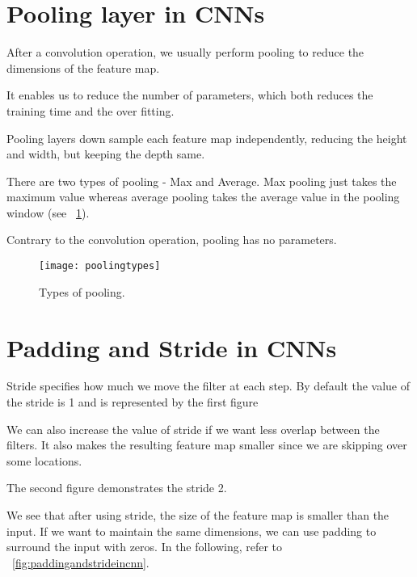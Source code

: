 	\section{Pooling layer in CNNs}

	\begin{bulletedlist}
		\item After a convolution operation, we usually perform pooling to reduce the dimensions of the feature map.
		\item It enables us to reduce the number of parameters, which both reduces the training time and the over fitting.
		\item Pooling layers down sample each feature map independently, reducing the height and width, but keeping the depth same.
		\item There are two types of pooling - Max and Average.  Max pooling just takes the maximum value whereas average pooling takes the average value in the pooling window (see \figurename~\ref{fig:poolingtypes}).
		\item Contrary to the convolution operation, pooling has no parameters.
	\end{bulletedlist}

	\begin{figure}[h]
		\centering
		\texttt{[image: poolingtypes]}
		\caption[Types of pooling]{Types of pooling.}
		\label{fig:poolingtypes}
	\end{figure}

	\section{Padding and Stride in CNNs}
	\begin{bulletedlist}
		\item Stride specifies how much we move the filter at each step. By default the value of the stride is 1 and is represented by the first figure
		\item We can also increase the value of stride if we want less overlap between the filters. It also makes the resulting feature map smaller since we are skipping over some locations.
		\item The second figure demonstrates the stride 2.
	\end{bulletedlist}

We see that after using stride, the size of the feature map is smaller than the input. If we want to maintain the same dimensions, we can use padding to surround the input with zeros.  In the following, refer to \figurename~\ref{fig:paddingandstrideincnn}.

